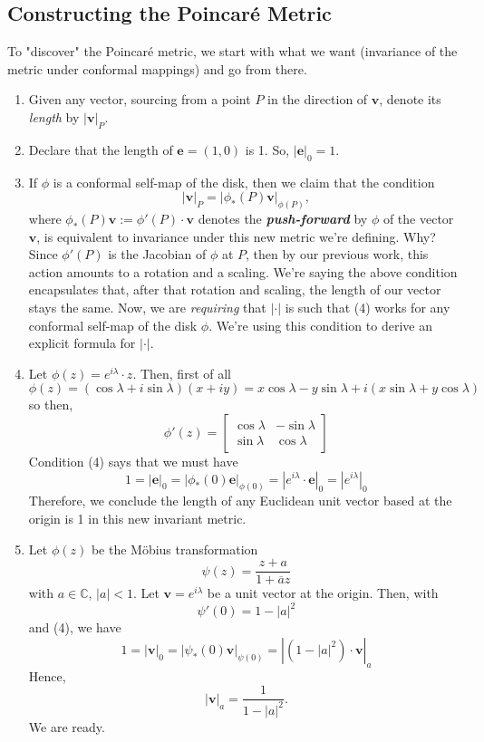 \documentclass[10pt]{article}
\theoremstyle{plain}
\begin{document}
\subsection*{Constructing the Poincaré Metric}
To "discover" the Poincaré metric, we start with what we want (invariance of the metric under conformal mappings) and go from there. 
	\begin{enumerate}
		\item Given any vector, sourcing from a point $P$ in the direction of $\mathbf{v}$, denote its \textit{length} by $|\mathbf{v}|_P$. 
		
		\item Declare that the length of $\mathbf{e} = (1, 0)$ is 1. So, $|\mathbf{e}|_0 = 1$. 
		
		\item If $\phi$ is a conformal self-map of the disk, then we claim that the condition
			\begin{equation}
				|\mathbf{v}|_P = |\phi_\ast(P) \mathbf{v}|_{\phi(P)},
			\end{equation}
		where $\phi_\ast(P)\mathbf{v} := \phi'(P) \cdot \mathbf{v}$ denotes the \textit{\textbf{push-forward}} by $\phi$ of the vector $\mathbf{v}$, is equivalent to invariance under this new metric we're defining. Why? Since $\phi'(P)$ is the Jacobian of $\phi$ at $P$, then by our previous work, this action amounts to a rotation and a scaling. We're saying the above condition encapsulates that, after that rotation and scaling, the length of our vector stays the same. Now, we are \textit{requiring} that $|\cdot|$ is such that (4) works for any conformal self-map of the disk $\phi$. We're using this condition to derive an explicit formula for $|\cdot|$.
		
		
		\item Let $\phi(z) = e^{i \lambda} \cdot z$. Then, first of all $$\phi(z) = (\cos \lambda + i \sin \lambda)(x + iy) = x \cos \lambda  - y \sin \lambda + i (x \sin \lambda + y \cos \lambda)$$ so then, 
			$$\phi'(z) = \begin{bmatrix} \cos \lambda & -\sin \lambda \\ \sin \lambda & \cos \lambda \end{bmatrix}$$  
		Condition (4) says that we must have $$1 = |\mathbf{e}|_0 = |\phi_\ast(0) \mathbf{e}|_{\phi(0)} = |e^{i \lambda} \cdot \mathbf{e}|_0 = |e^{i \lambda}|_0$$ Therefore, we conclude the length of any Euclidean unit vector based at the origin is 1 in this new invariant metric.
		
		\item Let $\phi(z)$ be the Möbius transformation $$\psi(z) = \frac{z + a}{1 + \overline{a} z}$$ with $a \in \mathbb{C}$, $|a| < 1$. Let $\mathbf{v} = e^{i \lambda}$ be a unit vector at the origin. Then, with $$\psi'(0) = 1 - |a|^2$$ and (4), we have $$1 = |\mathbf{v}|_0 = |\psi_\ast(0) \mathbf{v}|_{\psi(0)} = |(1 - |a|^2) \cdot \mathbf{v}|_a$$ Hence, $$|\mathbf{v}|_a = \frac{1}{1 - |a|^2}.$$
		We are ready.
	\end{enumerate}
\end{document}
